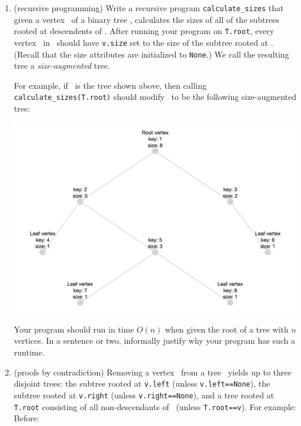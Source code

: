 \documentclass[11pt]{article}
\begin{document}
\begin{enumerate}
 \begin{enumerate}
 \item \label{part:calculatesizes} (recursive programming)
 Write a recursive program \texttt{calculate\_sizes} that given a vertex \btv\ of a binary tree \treeT, calculates the sizes of all of the subtrees rooted at descendents of \btv.  After running your program on \texttt{T.root}, every vertex \btv\ in \treeT\ should have \texttt{v.size} set to the size of the subtree rooted at \btv. (Recall that the size attributes are initialized to \texttt{None}.)  We call the resulting tree a {\em size-augmented} tree.
 
For example, if \treeT\  is the  tree shown above, 
then calling \texttt{calculate\_sizes(T.root)} should modify  \treeT\ to be the following size-augmented tree:

 \includegraphics[scale=.175]{ps0_assets/p0_q1_BT_after.png}

 Your program should run in time $O(n)$ when given the root of a tree with $n$ vertices. In a sentence or two, informally justify why your program has such a runtime. 
 
 \item (proofs by contradiction) \label{part:contradiction}
 Removing a vertex \btv\ from a tree \treeT\ yields up to three disjoint trees: the subtree rooted at
 \texttt{v.left} (unless \texttt{v.left==None}), the subtree rooted at
 \texttt{v.right} (unless \texttt{v.right==None}), and a tree rooted at \texttt{T.root} consisting of all non-descendants of \btv\ (unless \texttt{T.root==v}).  For example:
 \\

 Before:
 

\end{enumerate}
\end{enumerate}
\end{document}
